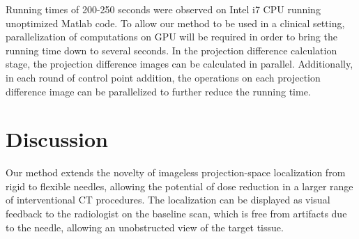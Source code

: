 \documentclass[letterpaper, 11 pt, conference]{ieeeconf}  %
\begin{document}
Running times of 200-250 seconds were observed on Intel i7 CPU running unoptimized Matlab code. To allow our method to be used in a clinical setting, parallelization of computations on GPU will be required in order to bring the running time down to several seconds. In the projection difference calculation stage, the projection difference images can be calculated in parallel. Additionally, in each round of control point addition, the operations on each projection difference image can be parallelized to further reduce the running time.

\section{Discussion}
Our method extends the novelty of imageless projection-space localization from rigid to flexible needles, allowing the potential of dose reduction in a larger range of interventional CT procedures. The localization can be displayed as visual feedback to the radiologist on the baseline scan, which is free from artifacts due to the needle, allowing an unobstructed view of the target tissue.
\end{document}
